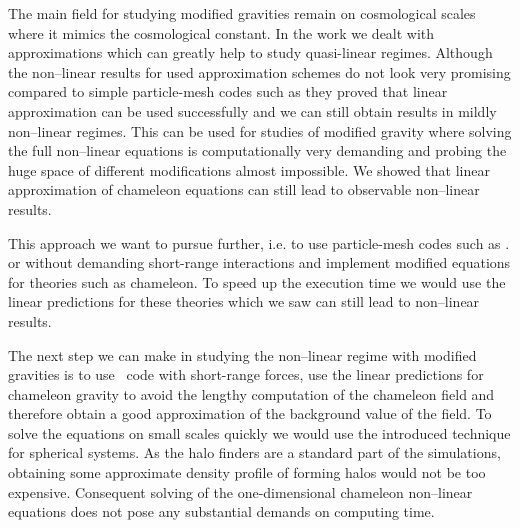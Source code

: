 The main field for studying modified gravities remain on cosmological scales where it mimics the cosmological constant. In the work we dealt with approximations which can greatly help to study quasi-linear regimes. Although the non--linear results for used approximation schemes do not look very promising compared to simple particle-mesh codes such as  they proved that linear approximation can be used successfully and we can still obtain results in mildly non--linear regimes. This can be used for studies of modified gravity where solving the full non--linear equations is computationally very demanding and probing the huge space of different modifications almost impossible. We showed that linear approximation of chameleon equations can still lead to observable non--linear results.

This approach we want to pursue further, i.e. to use particle-mesh codes such as .  or  without demanding short-range interactions and implement modified equations for theories such as chameleon. To speed up the execution time we would use the linear predictions for these theories which we saw can still lead to non--linear results.

The next step we can make in studying the non--linear regime with modified gravities is to use \nbody\ code with short-range forces, use the linear predictions for chameleon gravity to avoid the lengthy computation of the chameleon field and therefore obtain a good approximation of the background value of the field. To solve the equations on small scales quickly we would use the introduced technique for spherical systems. As the halo finders are a standard part of the simulations, obtaining some approximate density profile of forming halos would not be too expensive. Consequent solving of the one-dimensional chameleon non--linear equations does not pose any substantial demands on computing time.